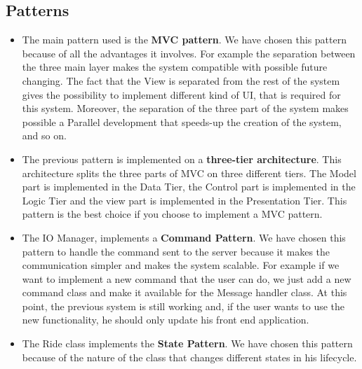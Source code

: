 \documentclass[../../../../dd.tex]{subfiles}
\begin{document}
		\subsection{Patterns}
			\begin{itemize}
				\item The main pattern used is the \textbf{MVC pattern}. We have chosen this pattern because of all the advantages it involves. For example the separation between the three main layer makes the system compatible with possible future changing. The fact that the View is separated from the rest of the system gives the possibility to implement different kind of UI, that is required for this system. Moreover, the separation of the three part of the system makes possible a Parallel development that speeds-up the creation of the system, and so on.
				
				\item The previous pattern is implemented on a \textbf{three-tier architecture}. This architecture splits the three parts of MVC on three different tiers. The Model part is implemented in the Data Tier, the Control part is implemented in the Logic Tier and the view part is implemented in the Presentation Tier. This pattern is the best choice if you choose to implement a MVC pattern.
				
				\item The IO Manager, implements a \textbf{Command Pattern}. We have chosen this pattern to handle the command sent to the server because it makes the communication simpler and makes the system scalable. For example if we want to implement a new command that the user can do, we just add a new command class and make it available for the Message handler class. At this point, the previous system is still working and, if the user wants to use the new functionality, he should only update his front end application.
				
				\item The Ride class implements the \textbf{State Pattern}. We have chosen this pattern because of the nature of the class that changes different states in his lifecycle.
			
			\end{itemize}
\end{document}
